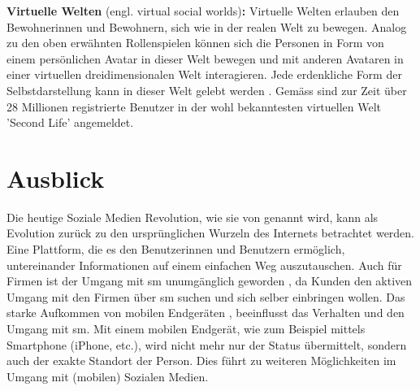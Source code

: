 \textbf{Virtuelle Welten} (engl. virtual social worlds)\textbf{:} Virtuelle Welten erlauben den Bewohnerinnen und Bewohnern, sich wie in der realen Welt zu bewegen. Analog zu den oben erwähnten Rollenspielen können sich die Personen in Form von einem persönlichen Avatar in dieser Welt bewegen und mit anderen Avataren in einer virtuellen dreidimensionalen Welt interagieren. Jede erdenkliche Form der Selbstdarstellung kann in dieser Welt gelebt werden \cite{Kaplan:2010}. Gemäss  sind zur Zeit über 28 Millionen registrierte Benutzer in der wohl bekanntesten virtuellen Welt 'Second Life' angemeldet.
\section{Ausblick}\label{sec.ausblick}
Die heutige Soziale Medien Revolution, wie sie von  genannt wird, kann als Evolution zurück zu den ursprünglichen Wurzeln des Internets betrachtet werden. Eine Plattform, die es den Benutzerinnen und Benutzern ermöglich, untereinander Informationen auf einem einfachen Weg auszutauschen. Auch für Firmen ist der Umgang mit \gls{sm} unumgänglich geworden \cite{Kietzmann:2011}, da Kunden den aktiven Umgang mit den Firmen über \gls{sm} suchen und sich selber einbringen wollen.\newline
Das starke Aufkommen von mobilen Endgeräten \cite{Kaplan:2012}, beeinflusst das Verhalten und den Umgang mit \gls{sm}. Mit einem mobilen Endgerät, wie zum Beispiel mittels Smartphone (iPhone, etc.), wird nicht mehr nur der Status übermittelt, sondern auch der exakte Standort der Person. Dies führt zu weiteren Möglichkeiten im Umgang mit (mobilen) Sozialen Medien. \newline
  





